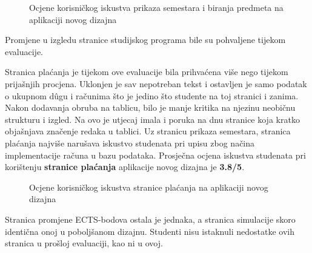 \documentclass[times, utf8, zavrsni, numeric]{fer}
\begin{document}
    \begin{figure} [H]
      \centering
      \caption{Ocjene korisničkog iskustva prikaza semestara i biranja predmeta na aplikaciji novog dizajna}
    \end{figure}
    
    Promjene u izgledu stranice studijskog programa bile su pohvaljene tijekom evaluacije.
    
    Stranica plaćanja je tijekom ove evaluacije bila prihvaćena više nego tijekom prijašnjih procjena. Uklonjen je sav nepotreban tekst i ostavljen je samo podatak o ukupnom dûgu i računima što je jedino što studente na toj stranici i zanima. Nakon dodavanja obruba na tablicu, bilo je manje kritika na njezinu neobičnu strukturu i izgled. Na ovo je utjecaj imala i poruka na dnu stranice koja kratko objašnjava značenje redaka u tablici. Uz stranicu prikaza semestara, stranica plaćanja najviše narušava iskustvo studenata pri upisu zbog načina implementacije računa u bazu podataka. Prosječna ocjena iskustva studenata pri korištenju \textbf{stranice plaćanja} aplikacije novog dizajna je \textbf{3.8/5}.
    
    \begin{figure} [H]
      \centering
      \caption{Ocjene korisničkog iskustva stranice plaćanja na aplikaciji novog dizajna}
    \end{figure}
    
    Stranica promjene ECTS-bodova ostala je jednaka, a stranica simulacije skoro identična onoj u poboljšanom dizajnu. Studenti nisu istaknuli nedostatke ovih stranica u prošloj evaluaciji, kao ni u ovoj.
    
\end{document}
